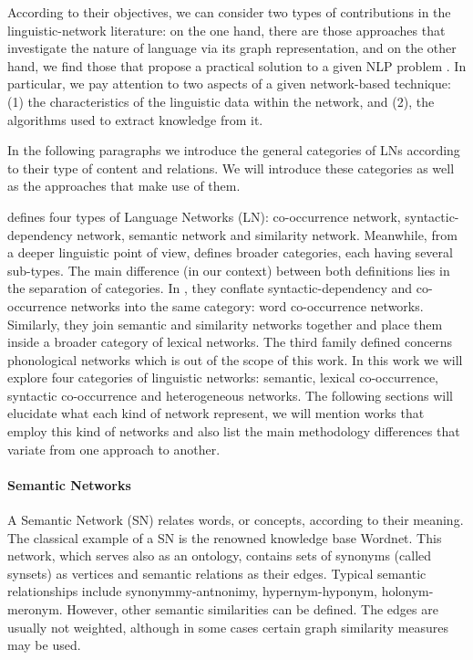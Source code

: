According to their objectives, we can consider two types of contributions in the linguistic-network literature: on the one hand, there are those approaches that investigate the nature of language via its graph representation, and on the other hand, we find those that propose a practical solution to a given NLP problem  \cite{Choudhury2009}. In particular, we pay attention to two aspects of a given network-based technique: (1) the  characteristics of the linguistic data within the network, and (2), the  algorithms used to extract knowledge from it.


In the following paragraphs we introduce the general categories of LNs according to their type of content and relations. We will introduce these categories as well as the  approaches that make use of them.

\cite{Mihalcea2011} defines four types of Language Networks (LN): co-occurrence network, syntactic-dependency network, semantic network and similarity network. Meanwhile, from a deeper linguistic point of view, \cite{Choudhury2009} defines broader categories, each having several sub-types. The main difference (in our context) between both definitions lies in the separation of categories. In \cite{Choudhury2009}, they conflate syntactic-dependency and co-occurrence networks into the same  category: word co-occurrence networks. Similarly, they join semantic and similarity networks together and place them inside a broader category of lexical networks. The third  family  defined concerns phonological networks which is out of the scope of this work. In this work we will explore four categories of linguistic networks: semantic, lexical co-occurrence, syntactic co-occurrence and heterogeneous networks. The following sections will elucidate what each kind of network represent, we will mention works that employ this kind of networks and also list the main methodology differences that  variate from one approach to another. 

\paragraph{Semantic Networks}
A Semantic Network (SN) relates words, or concepts, according to their meaning. The classical example of a SN is the renowned knowledge base Wordnet. This network, which serves also as an ontology, contains sets of synonyms (called synsets) as vertices and semantic relations as their edges. Typical semantic relationships include synonymmy-antnonimy, hypernym-hyponym, holonym-meronym. However, other semantic similarities can be defined. The edges are usually not weighted, although in some cases certain graph similarity measures may be used.

